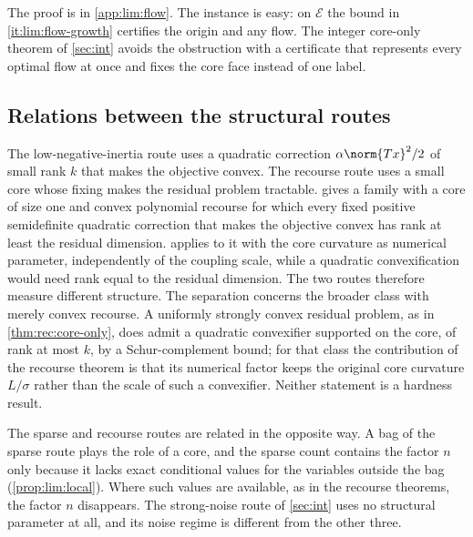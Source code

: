 The proof is in \cref{app:lim:flow}. The instance is easy: on $\mathcal E$
the bound in \ref{it:lim:flow-growth} certifies the origin and any flow. The
integer core-only theorem of \cref{sec:int} avoids the obstruction with a
certificate that represents every optimal flow at once and fixes the core
face instead of one label.

\subsection{Relations between the structural routes}\label{sec:lim:rank}

The low-negative-inertia route uses a quadratic correction
$\alpha\norm{Tx}^2/2$ of small rank $k$ that makes the objective convex. The
recourse route uses a small core whose fixing makes the residual problem
tractable.  gives a family with a core of size one and
convex polynomial recourse for which every fixed positive semidefinite
quadratic correction that makes the objective convex has rank at least the
residual dimension.  applies to it with the core
curvature as numerical parameter, independently of the coupling scale, while
a quadratic convexification would need rank equal to the residual
dimension. The two
routes therefore measure different structure. The separation concerns the
broader class with merely convex recourse. A uniformly strongly convex
residual problem, as in \cref{thm:rec:core-only}, does admit a quadratic
convexifier supported on the core, of rank at most $k$, by a Schur-complement
bound; for that class the contribution of the recourse theorem is that its
numerical factor keeps the original core curvature $L/\sigma$ rather than the
scale of such a convexifier. Neither statement is a hardness result.

The sparse and recourse routes are related in the opposite way. A bag of the
sparse route plays the role of a core, and the sparse count contains the
factor $n$ only because it lacks exact conditional values for the variables
outside the bag (\cref{prop:lim:local}). Where such values are available,
as in the recourse theorems, the factor $n$ disappears. The strong-noise
route of \cref{sec:int} uses no structural parameter at all, and its noise
regime is different from the other three.
